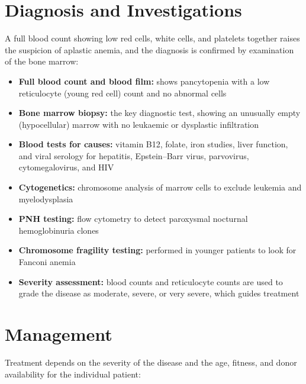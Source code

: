 \section*{Diagnosis and Investigations}
A full blood count showing low red cells, white cells, and platelets together raises the suspicion of aplastic anemia, and the diagnosis is confirmed by examination of the bone marrow:

\begin{itemize}
    \item \textbf{Full blood count and blood film:} shows pancytopenia with a low reticulocyte (young red cell) count and no abnormal cells
    \item \textbf{Bone marrow biopsy:} the key diagnostic test, showing an unusually empty (hypocellular) marrow with no leukaemic or dysplastic infiltration
    \item \textbf{Blood tests for causes:} vitamin B12, folate, iron studies, liver function, and viral serology for hepatitis, Epstein--Barr virus, parvovirus, cytomegalovirus, and HIV
    \item \textbf{Cytogenetics:} chromosome analysis of marrow cells to exclude leukemia and myelodysplasia
    \item \textbf{PNH testing:} flow cytometry to detect paroxysmal nocturnal hemoglobinuria clones
    \item \textbf{Chromosome fragility testing:} performed in younger patients to look for Fanconi anemia
    \item \textbf{Severity assessment:} blood counts and reticulocyte counts are used to grade the disease as moderate, severe, or very severe, which guides treatment
\end{itemize}

\section*{Management}
Treatment depends on the severity of the disease and the age, fitness, and donor availability for the individual patient:

